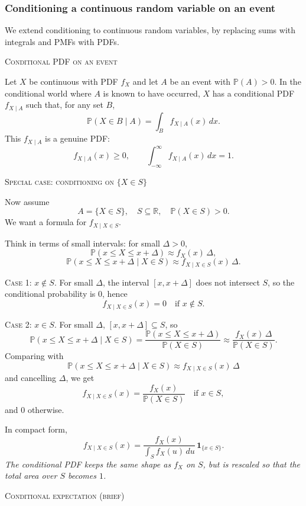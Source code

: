 \newpage
\subsubsection{Conditioning a continuous random variable on an event}

We extend conditioning to continuous random variables, by replacing sums with integrals and PMFs with PDFs.

\bigskip\textsc{Conditional PDF on an event}

Let \(X\) be continuous with PDF \(f_X\) and let \(A\) be an event with \(\mathbb{P}(A)>0\).  
In the conditional world where \(A\) is known to have occurred, \(X\) has a conditional PDF \(f_{X\mid A}\) such that, for any set \(B\),
\[
\mathbb{P}(X \in B \mid A) = \int_B f_{X\mid A}(x)\,dx.
\]
This \(f_{X\mid A}\) is a genuine PDF:
\[
f_{X\mid A}(x)\ge 0,\qquad \int_{-\infty}^{\infty} f_{X\mid A}(x)\,dx = 1.
\]

\bigskip\textsc{Special case: conditioning on \(\{X \in S\}\)}

Now assume
\[
A = \{X \in S\}, \quad S \subseteq \mathbb{R}, \quad \mathbb{P}(X \in S)>0.
\]
We want a formula for \(f_{X\mid X\in S}\).

Think in terms of small intervals: for small \(\Delta>0\),
\[
\mathbb{P}(x \le X \le x+\Delta) \approx f_X(x)\,\Delta,
\]
\[
\mathbb{P}(x \le X \le x+\Delta \mid X\in S) \approx f_{X\mid X\in S}(x)\,\Delta.
\]

\textsc{Case 1:} \(x \notin S\).  
For small \(\Delta\), the interval \([x,x+\Delta]\) does not intersect \(S\), so the conditional probability is \(0\), hence
\[
f_{X\mid X\in S}(x)=0 \quad \text{if } x\notin S.
\]

\textsc{Case 2:} \(x \in S\).  
For small \(\Delta\), \([x,x+\Delta]\subseteq S\), so
\[
\mathbb{P}(x \le X \le x+\Delta \mid X\in S)
=
\frac{\mathbb{P}(x \le X \le x+\Delta)}{\mathbb{P}(X\in S)}
\approx
\frac{f_X(x)\,\Delta}{\mathbb{P}(X\in S)}.
\]
Comparing with
\[
\mathbb{P}(x \le X \le x+\Delta \mid X\in S) \approx f_{X\mid X\in S}(x)\,\Delta
\]
and cancelling \(\Delta\), we get
\[
f_{X\mid X\in S}(x) = \frac{f_X(x)}{\mathbb{P}(X\in S)} \quad \text{if } x\in S,
\]
and \(0\) otherwise.

In compact form,
\[
f_{X\mid X\in S}(x)
=
\frac{f_X(x)}{\int_S f_X(u)\,du}\,\mathbf{1}_{\{x\in S\}}.
\]
\textit{The conditional PDF keeps the same shape as \(f_X\) on \(S\), but is rescaled so that the total area over \(S\) becomes \(1\).}

\bigskip\textsc{Conditional expectation (brief)}

